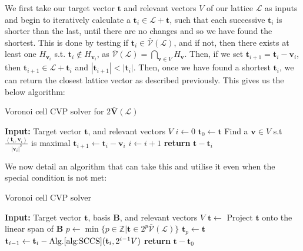 \documentclass[a4paper, 10pt]{article}
\theoremstyle{definition}
\begin{document}
We first take our target vector $\mathbf{t}$ and relevant vectors $V$ of our lattice $\mathcal{L}$ as inputs and begin to iteratively calculate a $\mathbf{t}_i \in \mathcal{L} + \mathbf{t}$, such that each successive $\mathbf{t}_i$ is shorter than the last, until there are no changes and so we have found the shortest. This is done by testing if $\mathbf{t}_i \in \bar{\mathcal{V}}(\mathcal{L})$, and if not, then there exists at least one $H_{\mathbf{v}_i}$ s.t. $\mathbf{t}_i \notin H_{\mathbf{v}_i}$, as $\bar{\mathcal{V}}(\mathcal{L}) = \bigcap _{\mathbf{v}\in V} H_{\mathbf{v}}$. Then, if we set $\mathbf{t}_{i+1} = \mathbf{t}_i - \mathbf{v}_i$, then $\mathbf{t}_{i+1} \in \mathcal{L} + \mathbf{t}_i$ and $|\mathbf{t}_{i+1}| < |\mathbf{t}_i|$. Then, once we have found a shortest $\mathbf{t}_i$, we can return the closest lattice vector as described previously. This gives us the below algorithm:


\begin{algorithm}[H]
    \caption{Voronoi cell CVP solver for $2 \bar{\mathbf{V}}(\mathcal{L})$}\label{alg:SCCS}
    \begin{algorithmic}[1]
    \State \textbf{Input:} Target vector $\mathbf{t}$, and relevant vectors $V$
    \State $i \gets 0$
    \State $\mathbf{t}_0 \gets \mathbf{t}$
        \State Find a $\mathbf{v} \in V$ s.t $\frac{\left\langle \mathbf{t}_i, \mathbf{v}_i\right\rangle}{|\mathbf{v}_i|^2}$ is maximal
        \State $\mathbf{t}_{i+1} \gets \mathbf{t}_i - \mathbf{v}_i$
        \State $i \gets i+1$
    \EndWhile
    \State \textbf{return} $\mathbf{t} - \mathbf{t}_i$
    \end{algorithmic}
\end{algorithm}

We now detail an algorithm that can take this and utilise it even when the special condition is not met:

\begin{algorithm}[H]
    \caption{Voronoi cell CVP solver}\label{alg:CVP}
    \begin{algorithmic}[1]
    \State \textbf{Input:} Target vector $\mathbf{t}$, basis $\mathbf{B}$, and relevant vectors $V$
    \State $\mathbf{t} \gets \mbox{ Project } \mathbf{t}$ onto the linear span of $\mathbf{B}$
    \State $p \gets \min \{p \in \mathbb{Z} | \mathbf{t} \in 2^p\bar{\mathcal{V}}(\mathcal{L})\}$
    \State $\mathbf{t}_p \gets \mathbf{t}$
        \State $\mathbf{t}_{i-1} \gets \mathbf{t}_{i} - \mbox{Alg.\ref{alg:SCCS}}(\mathbf{t}_i, 2^{i-1}V)$
    \EndFor
    \State \textbf{return} $\mathbf{t} - \mathbf{t}_0$
    \end{algorithmic}
\end{algorithm}
\end{document}
